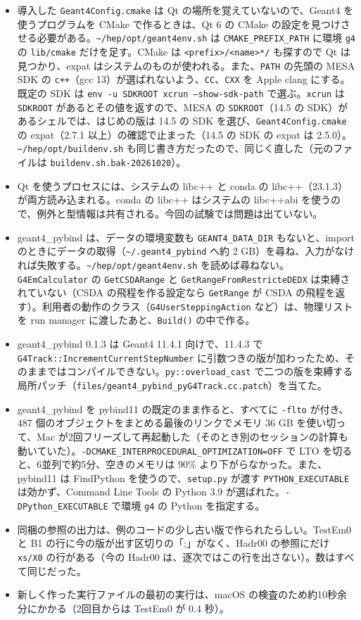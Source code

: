 \documentclass[a4paper,10pt]{ltjsarticle}
\newcommand{\pth}[1]{\texttt{\textasciitilde/}\nolinkurl{#1}}
\begin{document}
\begin{itemize}
\item 導入した \texttt{Geant4Config.cmake} は Qt の場所を覚えていないので、Geant4 を使うプログラムを CMake で作るときは、Qt 6 の CMake の設定を見つけさせる必要がある。\pth{hep/opt/geant4env.sh} は \texttt{CMAKE\_PREFIX\_PATH} に環境 \texttt{g4} の \texttt{lib/cmake} だけを足す。CMake は \texttt{<prefix>/<name>*/} も探すので Qt は見つかり、expat はシステムのものが使われる。また、\texttt{PATH} の先頭の MESA SDK の \texttt{c++}（gcc 13）が選ばれないよう、\texttt{CC}、\texttt{CXX} を Apple clang にする。既定の SDK は \texttt{env -u SDKROOT xcrun --show-sdk-path} で選ぶ。\texttt{xcrun} は \texttt{SDKROOT} があるとその値を返すので、MESA の \texttt{SDKROOT}（14.5 の SDK）があるシェルでは、はじめの版は 14.5 の SDK を選び、\texttt{Geant4Config.cmake} の expat（2.7.1 以上）の確認で止まった（14.5 の SDK の expat は 2.5.0）。\pth{hep/opt/buildenv.sh} も同じ書き方だったので、同じく直した（元のファイルは \texttt{buildenv.sh.bak-20261020}）。
\item Qt を使うプロセスには、システムの libc++ と conda の libc++（23.1.3）が両方読み込まれる。conda の libc++ はシステムの libc++abi を使うので、例外と型情報は共有される。今回の試験では問題は出ていない。
\item geant4\_pybind は、データの環境変数も \texttt{GEANT4\_DATA\_DIR} もないと、import のときにデータの取得（\pth{.geant4_pybind} へ約 2 GB）を尋ね、入力がなければ失敗する。\pth{hep/opt/geant4env.sh} を読めば尋ねない。\texttt{G4EmCalculator} の \texttt{GetCSDARange} と \texttt{GetRangeFromRestricteDEDX} は束縛されていない（CSDA の飛程を作る設定なら \texttt{GetRange} が CSDA の飛程を返す）。利用者の動作のクラス（\texttt{G4UserSteppingAction} など）は、物理リストを run manager に渡したあと、\texttt{Build()} の中で作る。
\item geant4\_pybind 0.1.3 は Geant4 11.4.1 向けで、11.4.3 で \texttt{G4Track::IncrementCurrentStepNumber} に引数つきの版が加わったため、そのままではコンパイルできない。\texttt{py::overload\_cast} で二つの版を束縛する局所パッチ（\nolinkurl{files/geant4_pybind_pyG4Track.cc.patch}）を当てた。
\item geant4\_pybind を pybind11 の既定のまま作ると、すべてに \texttt{-flto} が付き、487 個のオブジェクトをまとめる最後のリンクでメモリ 36 GB を使い切って、Mac が2回フリーズして再起動した（そのとき別のセッションの計算も動いていた）。\texttt{-DCMAKE\_INTERPROCEDURAL\_OPTIMIZATION=OFF} で LTO を切ると、6並列で約5分、空きのメモリは 90\% より下がらなかった。また、pybind11 は FindPython を使うので、\texttt{setup.py} が渡す \texttt{PYTHON\_EXECUTABLE} は効かず、Command Line Tools の Python 3.9 が選ばれた。\texttt{-DPython\_EXECUTABLE} で環境 \texttt{g4} の Python を指定する。
\item 同梱の参照の出力は、例のコードの少し古い版で作られたらしい。TestEm0 と B1 の行に今の版が出す区切りの「;」がなく、Hadr00 の参照にだけ \texttt{xs/X0} の行がある（今の Hadr00 は、逐次ではこの行を出さない）。数はすべて同じだった。
\item 新しく作った実行ファイルの最初の実行は、macOS の検査のため約10秒余分にかかる（2回目からは TestEm0 が 0.4 秒）。
\end{itemize}
\end{document}
